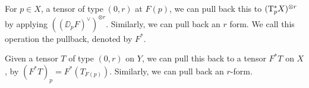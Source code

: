 \begin{definition}

    For \(p \in X\), a tensor of type \((0, r)\) at \(F(p)\), we can pull back this to \((\mathrm{T}_p^* X)^{\otimes r}\) by applying \(\left((\DD_pF)^\vee\right)^{\otimes r}\). Similarly, we can pull back an \(r\) form. We call this operation the pullback, denoted by \(F^*\).
\end{definition}

\begin{definition}
    [pullback]

    Given a tensor \(T\) of type \((0, r)\) on \(Y\), we can pull this back to a tensor \(F^*T\) on \(X\), by \((F^*T)_p = F^*(T_{F(p)})\). Similarly, we can pull back an \(r\)-form.
\end{definition}
